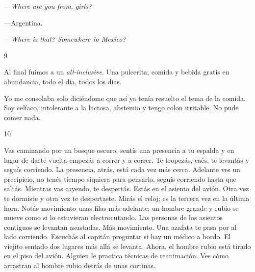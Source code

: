 \documentclass[12pt,twoside,openright,a5paper]{book}
\begin{document}
\nopagebreak

\vspace{0.5cm}

\nopagebreak

---\emph{Where are you from, girls?}

---Argentina.

---\emph{Where is that? Somewhere in Mexico?}

\vspace{0.5cm}

\hrulefill \hspace{0.1cm}\decofourleft\hspace{0.2cm} 9 \hspace{0.2cm}\decofourright \hspace{0.1cm}\hrulefill

\nopagebreak

\vspace{0.5cm}

\nopagebreak

Al final fuimos a un \emph{all-inclusive}. Una pulcerita, comida y bebida gratis en abundancia, todo el día, todos los días.

Yo me consolaba solo diciéndome que así ya tenía resuelto el tema de
la comida. Soy celíaco, intolerante a la lactosa, abstemio y tengo colon
irritable. No pude comer nada.


\vspace{0.5cm}

\hrulefill \hspace{0.1cm}\decofourleft\hspace{0.2cm} 10 \hspace{0.2cm}\decofourright \hspace{0.1cm}\hrulefill

\nopagebreak

\vspace{0.5cm}

\nopagebreak

Vas caminando por un bosque oscuro, sentís una presencia a tu espalda
y en lugar de darte vuelta empezás a correr y a correr. Te tropezás,
caés, te levantás y seguís corriendo. La presencia, atrás, está cada vez
más cerca. Adelante ves un precipicio, no tenés tiempo siquiera
para pensarlo, seguís corriendo hasta que saltás. Mientras vas cayendo, te
despertás. Estás en el asiento del avión. Otra vez te dormiste y otra vez
te despertaste. Mirás el reloj; es la tercera vez en la última hora. Notás
movimiento unas filas más adelante; un hombre grande y rubio se mueve  como
si lo estuvieran electrocutando. Las personas de los asientos contiguos
se levantan asustadas. Más movimiento. Una azafata te pasa por al lado
corriendo. Escuchás al capitán preguntar si hay un médico a bordo. El
viejito sentado dos lugares más allá se levanta. Ahora, el hombre rubio
está tirado en el piso del avión. Alguien le practica técnicas de
reanimación. Ves cómo arrastran al hombre rubio detrás de
unas cortinas.
\end{document}
